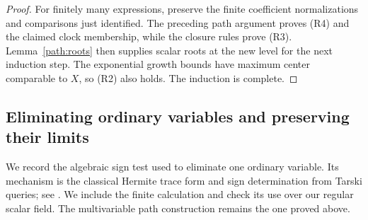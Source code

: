 \begin{proof}
For finitely many expressions, preserve the finite coefficient
normalizations and comparisons just identified.  The preceding path
argument proves \textup{(R4)} and the claimed clock membership, while
the closure rules prove \textup{(R3)}.  Lemma~\ref{path:roots} then
supplies scalar roots at the new level for the next induction step.
The exponential growth bounds have maximum center comparable to \(X\),
so \textup{(R2)} also holds.  The induction is complete.
\end{proof}

\subsection{Eliminating ordinary variables and preserving their limits}

We record the algebraic sign test used to eliminate one ordinary
variable. Its mechanism is the classical Hermite trace form and sign
determination from Tarski queries; see
\cite[arXiv version, Theorem~7 and Proposition~11]{PerrucciRoy2017}.
We include the finite calculation and check its use over our regular
scalar field. The multivariable path construction remains the one
proved above.

